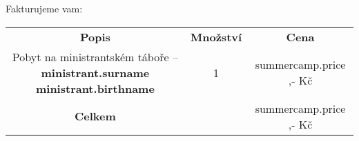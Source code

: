 \documentclass{article}
\begin{document}
Fakturujeme vam:

\begin{table}[h!]
    \begin{tabular}{ccc}
        \textbf{Popis} & \textbf{Množství} & \textbf{Cena} \\
        Pobyt na ministrantském táboře -- \textbf{ {{ ministrant.surname }} {{ ministrant.birthname }} }& 1 & {{ summercamp.price }},- Kč \\
        \hline
        \textbf{Celkem} & & {{ summercamp.price }},- Kč
    \end{tabular}
\end{table}
\end{document}
